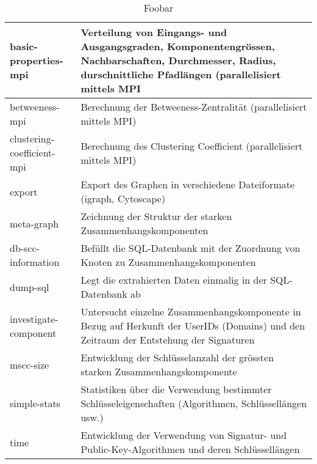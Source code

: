 \begin{appendix}
\begin{table}
  \begin{tabular}[h]{|l|p{9cm}|}
    \hline
    basic-properties-mpi & Verteilung von Eingangs- und Ausgangsgraden,
    Komponentengrössen, Nachbarschaften, Durchmesser, Radius,
    durschnittliche Pfadlängen (parallelisiert mittels
    MPI\\
    \hline
    betweeness-mpi & Berechnung der Betweeness-Zentralität
    (parallelisiert mittels MPI) \\
    \hline
    clustering-coefficient-mpi & Berechnung des Clustering Coefficient
    (parallelisiert mittels MPI) \\
    \hline
    export & Export des Graphen in verschiedene Dateiformate (igraph,
    Cytoscape) \\
    \hline
    meta-graph & Zeichnung der Struktur der starken
    Zusammenhangskomponenten \\
    \hline
    db-scc-information & Befüllt die SQL-Datenbank mit der Zuordnung
    von Knoten zu Zusammenhangskomponenten \\
    \hline
    dump-sql & Legt die extrahierten Daten einmalig in der
    SQL-Datenbank ab \\
    \hline 
    investigate-component & Untersucht einzelne
    Zusammenhangskomponente in Bezug auf Herkunft der UserIDs
    (Domains) und den Zeitraum der Entstehung der Signaturen \\
    \hline
    mscc-size & Entwicklung der Schlüsselanzahl der grössten starken
    Zusammenhangskomponente \\
    \hline
    simple-stats & Statistiken über die Verwendung bestimmter
    Schlüsseleigenschaften (Algorithmen, Schlüssellängen usw.) \\
    time & Entwicklung der Verwendung von Signatur- und
    Public-Key-Algorithmen und deren Schlüssellängen\\
    \hline
  \end{tabular}
  \caption{Foobar}
  \label{tab:tools}
\end{table}
\end{appendix}
